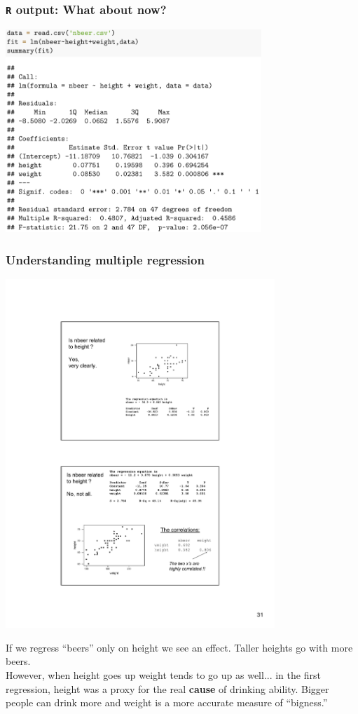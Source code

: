 \documentclass{beamer}
\newcommand{\bo}[1]{\textcolor{burntorange}{#1}}
\newcommand{\sk}{\vspace{.5cm}}
\begin{document}
\begin{frame}
	\frametitle{{\tt R} output: \bo{What about now?}}
	
	\vspace{2mm}
\hspace*{2mm}\includegraphics[width=3.8in]{figures/beersMLR2}
	
\end{frame}


\begin{frame}
\frametitle{Understanding multiple regression}


\includegraphics[width=4in]{figures/beer2}


If we regress ``beers'' only on height we see an effect.  Taller heights go with more beers. \\ \sk
However, when height goes up weight tends to go up as well... in the first regression, height was a proxy for the real \bo{\bf cause} of drinking ability. Bigger people can drink more and weight is a more accurate measure of ``bigness.''

\end{frame}
\end{document}
